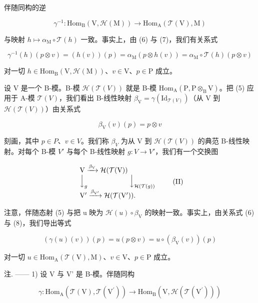 伴随同构的逆

\[
\gamma^ {- 1}: \mathrm{Hom} _ {\mathrm{B}} (\mathrm{V}, \mathcal {H} (\mathrm{M})) \longrightarrow \mathrm{Hom} _ {\mathrm{A}} (\mathcal {T} (\mathrm{V}), \mathrm{M})
\]

与映射 \(h \mapsto \alpha_{\mathrm{M}} \circ \mathcal{T}(h)\) 一致。事实上，由 (6) 与 (7)，我们有关系式

\[
\gamma^ {- 1} (h) (p \otimes v) = (h (v)) (p) = \alpha_ {\mathrm{M}} (p \otimes h (v)) = \alpha_ {\mathrm{M}} \circ \mathcal {T} (h) (p \otimes v)
\]

对一切 \(h\in \mathrm{Hom}_{\mathrm{B}}(\mathrm{V},\mathcal{H}(\mathrm{M}))\)、\(v\in \mathrm{V}\)、\(p\in \mathrm{P}\) 成立。

设 V 是一个 B-模。B-模 \(\mathcal{H}(\mathcal{T}(V))\) 就是 B-模 \(\mathrm{Hom}_{\mathrm{A}}(\mathrm{P},\mathrm{P}\otimes_{\mathrm{B}}\mathrm{V})\)。把 (5) 应用于 A-模 \(\mathcal{T}(V)\)，我们看出 B-线性映射 \(\beta_{\mathrm{V}}=\gamma(\mathrm{Id}_{\mathcal{T}(V)})\)（从 V 到 \(\mathcal{H}(\mathcal{T}(V))\)）由关系式

\[
\beta_ {\mathrm{V}} (v) (p) = p \otimes v\tag{8}
\]

刻画，其中 \(p \in P\)、\(v \in V\)。我们称 \(\beta_{V}\) 为从 V 到 \(\mathcal{H}(\mathcal{T}(V))\) 的典范 B-线性映射。对每个 B-模 \(V'\) 与每个 B-线性映射 \(g : V \to V'\)，我们有一个交换图

\[
\begin{array}{l} \mathrm{V} \xrightarrow {\beta_ {\mathrm{V}}} \mathcal {H} (\mathcal {T} (\mathrm{V})) \\ \Big \downarrow_ {g} \qquad \qquad \qquad \Big \downarrow_ {\mathcal {H} (\mathcal {T} (g))} \\ \mathrm{V} ^ {\prime} \xrightarrow {\beta_ {\mathrm{V} ^ {\prime}}} \mathcal {H} (\mathcal {T} (\mathrm{V} ^ {\prime})). \end{array}\tag{II}
\]

注意，伴随态射 (5) 与把 u 映为 \(\mathcal{H}(u)\circ\beta_{\mathrm{V}}\) 的映射一致。事实上，由关系式 (6) 与 (8)，我们导出等式

\[
(\gamma (u) (v)) (p) = u (p \otimes v) = u \circ (\beta_ {\mathrm{V}} (v)) (p)
\]

对一切 \(u \in \mathrm{Hom}_{\mathrm{A}}(\mathcal{T}(\mathrm{V}), \mathrm{M})\)、\(v \in \mathrm{V}\)、\(p \in \mathrm{P}\) 成立。

注. —— 1) 设 V 与 V' 是 B-模。伴随同构

\[
\gamma : \mathrm{Hom} _ {\mathrm{A}} (\mathcal {T} (\mathrm{V}), \mathcal {T} (\mathrm{V} ^ {\prime})) \longrightarrow \mathrm{Hom} _ {\mathrm{B}} (\mathrm{V}, \mathcal {H} (\mathcal {T} (\mathrm{V} ^ {\prime})))
\]

